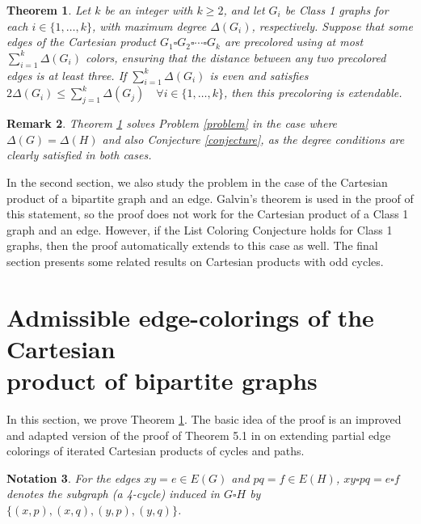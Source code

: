 \documentclass[a4paper,12pt]{article}
\newtheorem{theorem}{\bf Theorem}[section]
\newtheorem{nota}[theorem]{\bf Notation}
\newtheorem{remark}[theorem]{\bf Remark}
\begin{document}
\begin{theorem} \label{general}
    Let $k$ be an integer with $k \geq 2$, and let $G_i$ be Class 1 graphs for each $i \in \{1, \dots, k\}$, with maximum degree $\Delta(G_i)$, respectively. Suppose that some edges of the Cartesian product $G_1 \square G_2 \square \cdots \square G_k$ are precolored using at most $\sum_{i=1}^k \Delta(G_i)$ colors, ensuring that the distance between any two precolored edges is at least three. If $\sum_{i=1}^k \Delta(G_i)$ is even and satisfies $2\Delta(G_i) \le \sum_{j=1}^k \Delta(G_j) \quad \forall i \in \{1, \dots, k\}$, then this precoloring is extendable.
\end{theorem}

\begin{remark}
    \textup{Theorem \ref{general} solves Problem \ref{problem} in the case where $\Delta(G)=\Delta(H)$ and also Conjecture \ref{conjecture}, as the degree conditions are clearly satisfied in both cases.}
\end{remark}

In the second section, we also study the problem in the case of the Cartesian product of a bipartite graph and an edge. Galvin's theorem \cite{Galvin} is used in the proof of this statement, so the proof does not work for the Cartesian product of a Class 1 graph and an edge. However, if the List Coloring Conjecture holds for Class 1 graphs, then the proof automatically extends to this case as well. The final section presents some related results on Cartesian products with odd cycles. 





\section{Admissible edge-colorings of the Cartesian \\ product of bipartite graphs}

In this section, we prove Theorem \ref{general}. The basic idea of the proof is an improved and adapted version of the proof of Theorem 5.1 in \cite{Casselgren} on extending partial edge colorings of iterated Cartesian products of cycles and paths.

\begin{nota}
    \textup{For the edges $xy=e \in E(G)$ and $pq=f \in E(H)$, $xy \square pq = e \square f$ denotes the subgraph (a 4-cycle) induced in $G \square H$ by $\{(x,p),(x,q),(y,p),(y,q)\}$.}
\end{nota}
\end{document}

